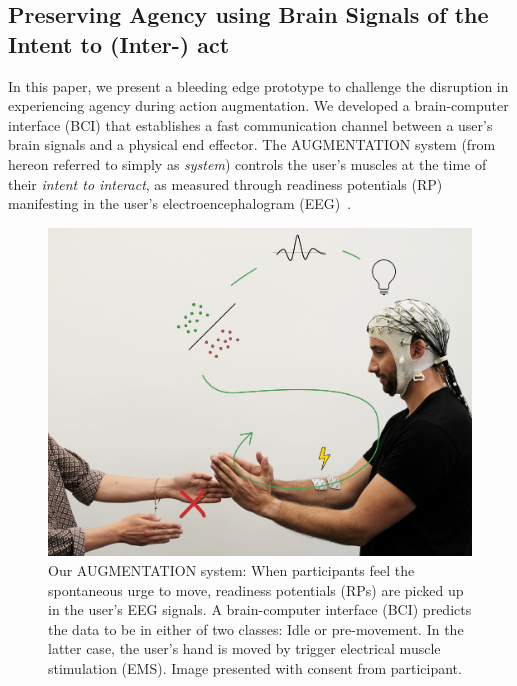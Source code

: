 
\subsection{Preserving Agency using Brain Signals of the Intent to (Inter-) act}
In this paper, we present a bleeding edge prototype to challenge the disruption in experiencing agency during action augmentation. We developed a brain-computer interface (BCI) that establishes a fast communication channel between a user's brain signals and a physical end effector. The AUGMENTATION system (from hereon referred to simply as \textit{system}) controls the user's muscles at the time of their \textit{intent to interact}, as measured through readiness potentials (RP) manifesting in the user's electroencephalogram (EEG)~\cite{Nguyen2023-me, Schurger2021-vp, Schultze-Kraft2016-bx, Schultze-Kraft2021-cu}. 

\begin{figure}[!h]
    \centering
    \includegraphics[width=\columnwidth]{figures/bci_game.png}
    \caption{Our AUGMENTATION system: When participants feel the spontaneous urge to move, readiness potentials (RPs) are picked up in the user's EEG signals. A brain-computer interface (BCI) predicts the data to be in either of two classes: Idle or pre-movement. In the latter case, the user's hand is moved by trigger electrical muscle stimulation (EMS). Image presented with consent from participant.}
\end{figure}

